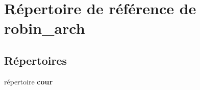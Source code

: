 \section{Répertoire de référence de robin\-\_\-arch}
\label{dir_926bc8987637cf8d6ec13191f904a729}
\subsection*{Répertoires}
\begin{DoxyCompactItemize}
\item 
répertoire {\bf cour}
\end{DoxyCompactItemize}
